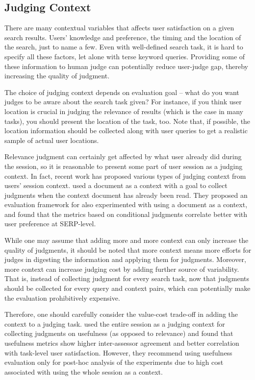 \documentclass[openany]{now} %
\begin{document}
\subsection{Judging Context}
\label{s:judging-context}
There are many contextual variables that affects user satisfaction on a given search results. Users' knowledge and preference, the timing and the location of the search, just to name a few. Even with well-defined search task, it is hard to specify all these factors, let alone with terse keyword queries. Providing some of these information to human judge can potentially reduce user-judge gap, thereby increasing the quality of judgment. 

The choice of judging context depends on evaluation goal -- what do you want judges to be aware about the search task given? For instance, if you think user location is crucial in judging the relevance of results (which is the case in many tasks), you should present the location of the task, too. Note that, if possible, the location information should be collected along with user queries to get a realistic sample of actual user locations.

Relevance judgment can certainly get affected by what user already did during the session, so it is reasonable to present some part of user session as a judging context. In fact, recent work has proposed various types of judging context from users' session context. \cite{Chandar2013} used a document as a context with a goal to collect judgments when the context document has already been read. They proposed an evaluation framework for \cite{Golbus:2014:CDR} also experimented with using a document as a context, and found that the metrics based on conditional judgments correlate better with user preference at SERP-level.

While one may assume that adding more and more context can only increase the quality of judgments, it should be noted that more context means more efforts for judges in digesting the information and applying them for judgments. Moreover, more context can increase judging cost by adding further source of variability. That is, instead of collecting judgment for every search task, now that judgments should be collected for every query and context pairs, which can potentially make the evaluation prohibitively expensive.

Therefore, one should carefully consider the value-cost trade-off in adding the context to a judging task. \cite{Mao:2016} used the entire session as a judging context for collecting judgments on usefulness (as opposed to relevance) and found that usefulness metrics show higher inter-assessor agreement and better correlation with task-level user satisfaction. However, they recommend using usefulness evaluation only for post-hoc analysis of the experiments due to high cost associated with using the whole session as a context.
\end{document}
